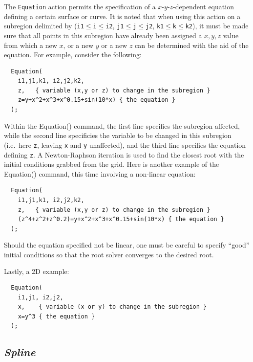 \documentclass{warpdoc}
\begin{document}
The \verb|Equation| action permits the specification
of a $x$-$y$-$z$-dependent equation defining a certain
surface or curve. It is noted that
when using this action on a subregion delimited by
(\verb|i1|$\leq$\verb|i|$\leq$\verb|i2|,
  \verb|j1|$\leq$\verb|j|$\leq$\verb|j2|,
  \verb|k1|$\leq$\verb|k|$\leq$\verb|k2|),
it must be made sure that all points in this subregion have already been
assigned a $x, y, z$ value from which a new $x$, or a new $y$ or a
new $z$ can be determined with the aid of the equation.
For example, consider the following:
%
\begin{verbatim}
  Equation(
    i1,j1,k1, i2,j2,k2,
    z,   { variable (x,y or z) to change in the subregion }
    z=y+x^2+x^3+x^0.15+sin(10*x) { the equation }
  );
\end{verbatim}
%
Within the Equation() command, the first line specifies the subregion affected, 
while the second line  specificies  the variable to be
changed in this subregion (i.e.\ here  \verb|z|, leaving \verb|x| and \verb|y|
unaffected), and the third line specifies the equation defining \verb|z|. A Newton-Raphson 
iteration is used to find the closest root with the initial conditions grabbed
from the grid. Here is another example of the Equation() command, this time involving
a non-linear equation:
%
\begin{verbatim}
  Equation(
    i1,j1,k1, i2,j2,k2,
    z,   { variable (x,y or z) to change in the subregion }
    (z^4+z^2+z^0.2)=y+x^2+x^3+x^0.15+sin(10*x) { the equation }
  );
\end{verbatim}
%
Should the equation specified not be linear, one must be 
careful to specify ``good'' initial conditions so that the root solver converges to the desired
root. 

Lastly, a 2D example:
%
\begin{verbatim}
  Equation(
    i1,j1, i2,j2,
    x,    { variable (x or y) to change in the subregion }
    x=y^3 { the equation }
  );
\end{verbatim}
%


\subsection{\emph{Spline}}
\end{document}
